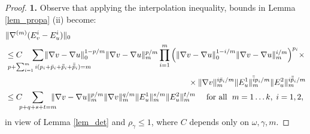 \documentclass[reqno,twoside,11pt]{amsart}
\newcommand*{\dbar}[1]{\bar{\bar{#1}}}
\newcommand*{\tbar}[1]{\bar{\dbar{#1}}}
\numberwithin{equation}{section}
\theoremstyle{plain}
\theoremstyle{definition}
\begin{document}
\begin{proof}
{\bf 1.} Observe that applying the interpolation
inequality, bounds in Lemma \ref{lem_propa} (ii) become:
\begin{equation}\label{glo3}
\begin{split}    
& \|\nabla^{(m)}(E^i_v-E^i_u)\|_0\\ & \leq C \hspace{-7mm}\sum_{p+\sum_{i=1}^mi(p_i+\bar
  p_i + \dbar p_i+\tbar p_i)=m\hspace{-10mm}} \hspace{-11mm}
\|\nabla v-\nabla u\|_0^{1-p/m}\|\nabla v-\nabla u\|_m^{p/m}
\prod_{i=1}^m \Big(\|\nabla v - \nabla u\|_0^{1-i/m}\|\nabla v -
\nabla u\|_m^{i/m}\Big)^{p_i} \times
\\ & \hspace{8cm} \times \|\nabla v\|_m^{i\bar p_i/m}
\|E^1_u\|_m^{\dbar ip_i/m} \|E^2_u\|_m^{i\tbar p_i/m}
\\ & \leq C \hspace{-2mm}\sum_{p+q+s+t=m} \hspace{-3mm}
\|\nabla v-\nabla u\|_m^{p/m}\|\nabla v\|_m^{q/m} \|E^1_u\|_m^{s/m} \|E^2_u\|_m^{t/m}
\quad \mbox{ for all }\; m=1\ldots k, \; i=1,2,
\end{split}
\end{equation}
in view of Lemma \ref{lem_det} and $\rho_\gamma\leq 1$, where $C$ depends only on $\omega, \gamma, m$.

\smallskip  


\end{proof}
\end{document}
